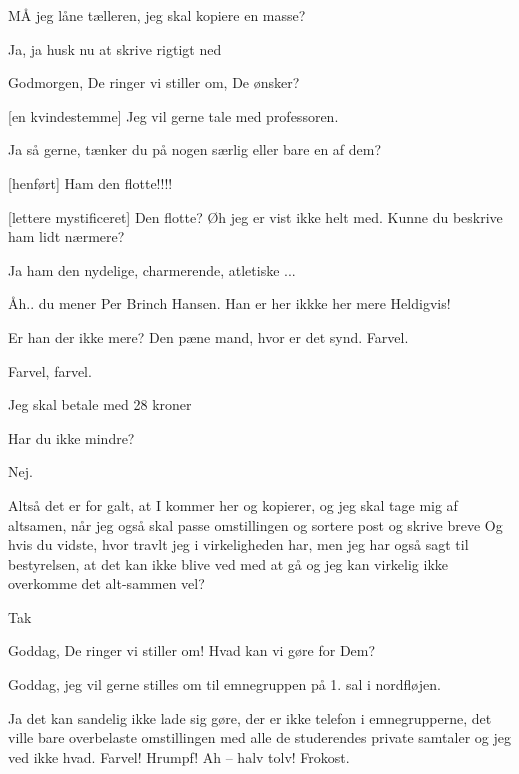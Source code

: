 \documentclass[a4paper,11pt]{article}
\begin{document}
\begin{sketch}



 MÅ jeg låne tælleren, jeg skal kopiere en masse?

 Ja, ja husk nu at skrive rigtigt ned 

 Godmorgen, De ringer vi stiller om, De ønsker?

[en kvindestemme] Jeg vil gerne tale med professoren.

 Ja så gerne, tænker du på nogen særlig eller bare en af dem?

[henført] Ham den flotte!!!!

[lettere mystificeret] Den flotte? Øh jeg er vist ikke helt med. Kunne
du beskrive ham lidt nærmere?

 Ja ham den nydelige, charmerende, atletiske ...

 Åh.. du mener Per Brinch Hansen. Han er her ikkke her mere  Heldigvis!

 Er han der ikke mere? Den pæne mand, hvor er det
synd. Farvel. 

 Farvel, farvel. 


 Jeg skal betale med 28 kroner 

 Har du ikke mindre?

 Nej.

 Altså det er for galt, at I kommer her og kopierer, og jeg skal tage
mig af altsamen, når jeg også skal passe omstillingen og sortere post og skrive
breve  Og hvis du
vidste, hvor travlt jeg i virkeligheden har, men jeg har også sagt til
bestyrelsen, at det kan ikke blive ved med at gå og jeg kan virkelig ikke
overkomme det alt-sammen vel? 


 Tak 


 Goddag, De ringer vi stiller om! Hvad kan vi gøre for Dem?

 Goddag, jeg vil gerne stilles om til emnegruppen på 1. sal i
nordfløjen.

 Ja det kan sandelig ikke lade sig gøre, der er ikke telefon i
emnegrupperne, det ville bare overbelaste omstillingen med alle de studerendes
private samtaler og jeg ved ikke hvad. Farvel! 
Hrumpf!  Ah -- halv tolv! Frokost. 

\end{sketch}
\end{document}
